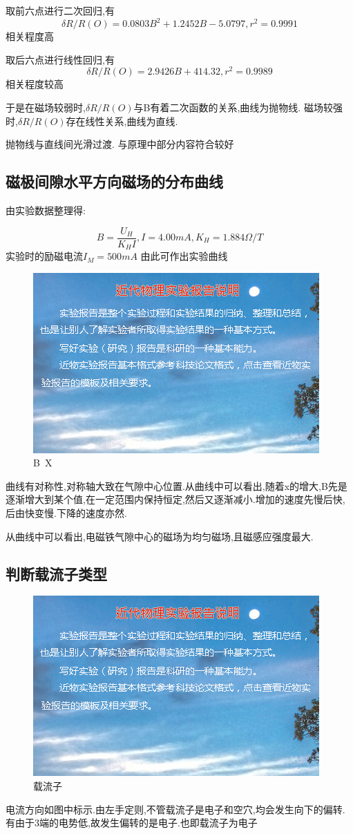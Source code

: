 \documentclass{thuemp}
\begin{document}
取前六点进行二次回归,有
\[\delta R/R(O)=0.0803B^{2}+1.2452B-5.0797,r^{2}=0.9991\]
相关程度高

取后六点进行线性回归,有
\[\delta R/R(O)=2.9426B+414.32,r^{2}=0.9989\]
相关程度较高

于是在磁场较弱时,$ \delta R/R(O) $与B有着二次函数的关系,曲线为抛物线.
磁场较强时,$ \delta R/R(O) $存在线性关系,曲线为直线.

抛物线与直线间光滑过渡.
与原理中部分内容符合较好
\subsection{磁极间隙水平方向磁场的分布曲线}
由实验数据整理得:

\[B=\frac{U_{H}}{K_{H}I},I=4.00mA,K_{H}=1.884 \Omega/T\]
	实验时的励磁电流$I_{M}=500mA$
由此可作出实验曲线
\begin{figure}[H]
	\centering
	\includegraphics[width=0.8\linewidth]{./image/example.jpg}
	\caption{B~X} \label{fig:eg}
\end{figure}
曲线有对称性,对称轴大致在气隙中心位置.从曲线中可以看出,随着x的增大,B先是逐渐增大到某个值,在一定范围内保持恒定,然后又逐渐减小.增加的速度先慢后快,后由快变慢.下降的速度亦然.

从曲线中可以看出,电磁铁气隙中心的磁场为均匀磁场,且磁感应强度最大.
\subsection{判断载流子类型}
\begin{figure}[H]
	\centering
	\includegraphics[width=0.8\linewidth]{./image/example.jpg}
	\caption{载流子} \label{fig:eg}
\end{figure}
电流方向如图中标示.由左手定则,不管载流子是电子和空穴,均会发生向下的偏转.有由于3端的电势低,故发生偏转的是电子.也即载流子为电子
\end{document}
